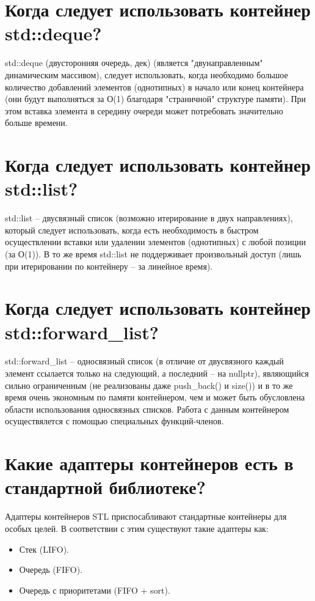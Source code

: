 \documentclass[a4paper,12pt]{article}	%
\begin{document}
\section{Когда следует использовать контейнер std::deque?}

	std::deque (двусторонняя очередь, дек) (является "двунаправленным" динамическим массивом), следует использовать, когда необходимо большое количество добавлений элементов (однотипных) в начало или конец контейнера (они будут выполняться за О(1) благодаря "страничной" структуре памяти). При этом вставка элемента в середину очереди может потребовать значительно больше времени.

\section{Когда следует использовать контейнер std::list?}

	std::list -- двусвязный список (возможно итерирование в двух направлениях), который следует использовать, когда есть необходимость в быстром осуществлении вставки или удалении элементов (однотипных) с любой позиции (за О(1)). В то же время std::list не поддерживает произвольный доступ (лишь при итерировании по контейнеру -- за линейное время).

\section{Когда следует использовать контейнер std::forward\_list?}

	std::forward\_list -- односвязный список (в отличие от двусвязного каждый элемент ссылается только на следующий, а последний -- на nullptr), являющийся сильно ограниченным (не реализованы даже push\_back() и size()) и в то же время очень экономным по памяти контейнером, чем и может быть обусловлена области использования односвязных списков. Работа с данным контейнером осуществялется с помощью специальных функций-членов.

\section{Какие адаптеры контейнеров есть в стандартной библиотеке?}

	Адаптеры контейнеров STL приспосабливают стандартные контейнеры для особых целей. В соответствии с этим существуют такие адаптеры как:
	
	\begin{itemize}
	
		\item Стек (LIFO).
		
		\item Очередь (FIFO).
		
		\item Очередь с приоритетами (FIFO + sort).
	
	\end{itemize}
\end{document}
